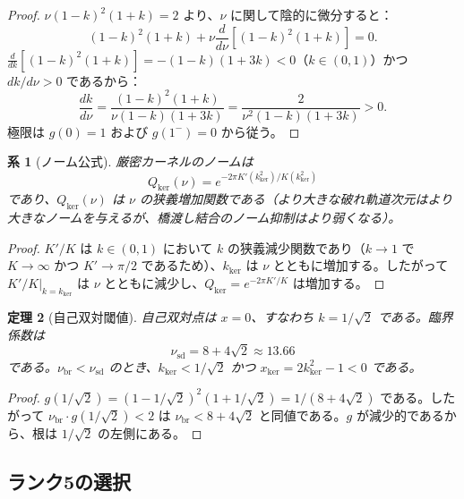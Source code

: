 \documentclass[12pt]{article}
\theoremstyle{plain}
\newtheorem{theorem}{定理}[section]
\newtheorem{corollary}[theorem]{系}
\theoremstyle{definition}
\numberwithin{equation}{section}
\newcommand{\br}{\mathrm{br}}
\newcommand{\kker}{\mathrm{ker}}
\begin{document}
\begin{proof}
$\nu(1-k)^2(1+k)=2$ より、$\nu$ に関して陰的に微分すると：
\begin{equation}
(1-k)^2(1+k)+\nu\frac{d}{d\nu}[(1-k)^2(1+k)]=0.
\end{equation}
$\frac{d}{dk}[(1-k)^2(1+k)]=-(1-k)(1+3k)<0$（$k\in(0,1)$）かつ $dk/d\nu>0$ であるから：
\begin{equation}
\frac{dk}{d\nu} = \frac{(1-k)^2(1+k)}{\nu(1-k)(1+3k)} = \frac{2}{\nu^2(1-k)(1+3k)} > 0.
\end{equation}
極限は $g(0)=1$ および $g(1^-)=0$ から従う。
\end{proof}

\begin{corollary}[ノーム公式]\label{cor:nome}
厳密カーネルのノームは
\begin{equation}
Q_{\kker}(\nu) = e^{-2\pi K'(k_{\kker}^2)/K(k_{\kker}^2)}
\end{equation}
であり、$Q_{\kker}(\nu)$ は $\nu$ の狭義増加関数である（より大きな破れ軌道次元はより大きなノームを与えるが、橋渡し結合のノーム抑制はより弱くなる）。
\end{corollary}

\begin{proof}
$K'/K$ は $k\in(0,1)$ において $k$ の狭義減少関数であり（$k\to 1$ で $K\to\infty$ かつ $K'\to\pi/2$ であるため）、$k_{\kker}$ は $\nu$ とともに増加する。したがって $K'/K|_{k=k_{\kker}}$ は $\nu$ とともに減少し、$Q_{\kker}=e^{-2\pi K'/K}$ は増加する。
\end{proof}

\begin{theorem}[自己双対閾値]\label{thm:selfdual}
自己双対点は $x=0$、すなわち $k=1/\sqrt{2}$ である。臨界係数は
\begin{equation}
\nu_{\mathrm{sd}} = 8+4\sqrt{2} \approx 13.66
\end{equation}
である。$\nu_{\br}<\nu_{\mathrm{sd}}$ のとき、$k_{\kker}<1/\sqrt{2}$ かつ $x_{\ker}=2k_{\kker}^2-1<0$ である。
\end{theorem}

\begin{proof}
$g(1/\sqrt{2})=(1-1/\sqrt{2})^2(1+1/\sqrt{2})=1/(8+4\sqrt{2})$ である。したがって $\nu_{\br}\cdot g(1/\sqrt{2})<2$ は $\nu_{\br}<8+4\sqrt{2}$ と同値である。$g$ が減少的であるから、根は $1/\sqrt{2}$ の左側にある。
\end{proof}

\subsection{ランク5の選択}
\end{document}
